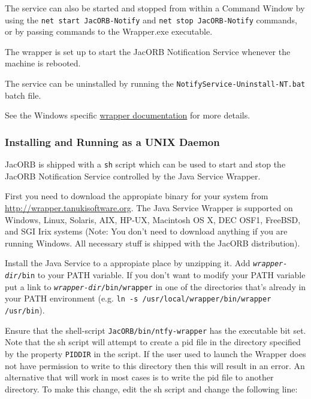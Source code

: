 The service can also be started and stopped from within a Command
Window by using the \texttt{net start JacORB-Notify} and \texttt{net
  stop JacORB-Notify} commands, or 
by passing commands to the Wrapper.exe executable. 

The wrapper is set up to start the JacORB Notification Service
whenever the machine is rebooted.

The service can be uninstalled by running the
\texttt{NotifyService-Uninstall-NT.bat} batch file.

See the Windows specific
\href{http://wrapper.tanukisoftware.org/doc/english/launch-win.html}{wrapper
  documentation} for more details.
  

\subsubsection{Installing and Running as a UNIX Daemon}
\label{sec:inst-runn-as}

JacORB is shipped with a \texttt{sh} script which can be used to start
and stop the JacORB Notification Service controlled by the Java
Service Wrapper.

First you need to download the appropiate binary for your system from
\href{http://wrapper.tanukisoftware.org}{http://wrapper.tanukisoftware.org}.
The Java Service Wrapper is supported on Windows, Linux, Solaris, AIX,
HP-UX, Macintosh OS X, DEC OSF1, FreeBSD, and SGI Irix systems (Note:
You don't need to download anything if you are running Windows. All
necessary stuff is shipped with the JacORB distribution).

Install the Java Service to a appropiate place by unzipping it. Add
\texttt{\emph{wrapper-dir}/bin} to your PATH variable. If you don't
want to modify your PATH variable put a link to
\texttt{\emph{wrapper-dir}/bin/wrapper} in one of the directories
that's already in your PATH environment (e.g. \texttt{ln -s
  /usr/local/wrapper/bin/wrapper /usr/bin}).

Ensure that the shell-script
\texttt{JacORB/bin/ntfy-wrapper} has the executable bit set. Note that
the sh script will attempt to create a pid file in the directory
specified by the property \texttt{PIDDIR} in the script. If
the user used to launch the Wrapper does not have permission to write
to this directory then this will result in an error. An alternative
that will work in most cases is to write the pid file to another
directory. To make this change, edit the sh  script and change the following line: 

